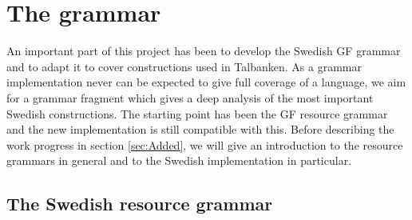 \documentclass{report}
\begin{document}
\chapter{The grammar}
\label{sec:prog.grammar}
An important part of this project has been to develop the Swedish GF grammar and
to adapt it to cover
constructions used in Talbanken. As a grammar implementation never can be
expected to give
full coverage of a language, we aim for a grammar fragment which gives a deep
analysis of the most important Swedish constructions.
The starting point has been the GF resource grammar and the new implementation is
still compatible with this.
Before describing the work progress in section \ref{sec:Added}, we will give an introduction to the
resource grammars in general and to the Swedish implementation in particular.



\section{The Swedish resource grammar}
\label{sec:swegf}
\end{document}
